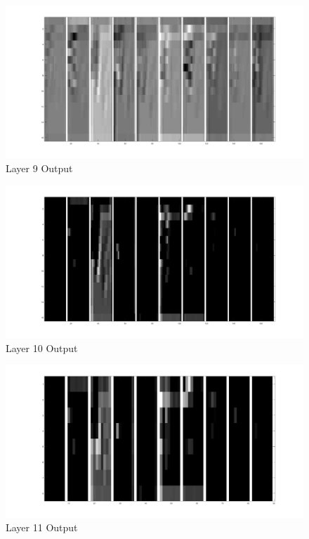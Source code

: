 \documentclass[11pt,english]{article}
\begin{document}
\begin{appendices}
\begin{figure}[h!]
  \caption{Layer 9 Output}
  \centering
    \includegraphics[width=\textwidth]{layer/9}
\end{figure}

\begin{figure}[h!]
  \caption{Layer 10 Output}
  \centering
    \includegraphics[width=\textwidth]{layer/10}
\end{figure}

\begin{figure}[h!]
  \caption{Layer 11 Output}
  \centering
    \includegraphics[width=\textwidth]{layer/11}
\end{figure}


\end{appendices}
\end{document}
